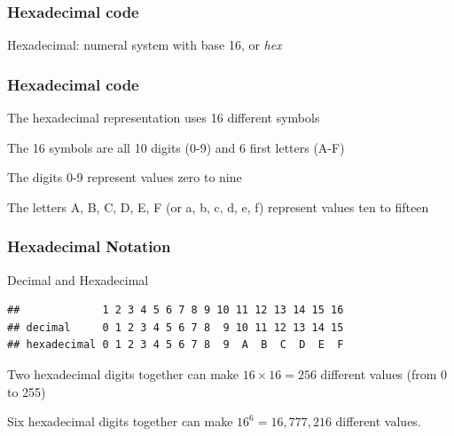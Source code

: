 \documentclass[12pt]{beamer}\usepackage[]{graphicx}\usepackage[]{color}
\makeatletter
\newenvironment{kframe}{%
 \def\at@end@of@kframe{}%
 \ifinner\ifhmode%
  \def\at@end@of@kframe{\end{minipage}}%
  \begin{minipage}{\columnwidth}%
 \fi\fi%
 \def\FrameCommand##1{\hskip\@totalleftmargin \hskip-\fboxsep
 \colorbox{shadecolor}{##1}\hskip-\fboxsep
     \hskip-\linewidth \hskip-\@totalleftmargin \hskip\columnwidth}%
 \MakeFramed {\advance\hsize-\width
   \@totalleftmargin\z@ \linewidth\hsize
   \@setminipage}}%
 {\par\unskip\endMakeFramed%
 \at@end@of@kframe}
\newenvironment{knitrout}{}{} %
\makeatother
\begin{document}

\begin{frame}
\frametitle{Hexadecimal code}

\begin{center}
Hexadecimal: numeral system with base 16, or \textit{hex}

\bigskip
{}
\end{center}

\end{frame}


\begin{frame}
\frametitle{Hexadecimal code}

 \bi
  \item The hexadecimal representation uses 16 different symbols
  \item The 16 symbols are all 10 digits (0-9) and 6 first letters (A-F)
  \item The digits 0-9 represent values zero to nine
  \item The letters A, B, C, D, E, F (or a, b, c, d, e, f) represent values ten to fifteen
 \ei
\eb

\end{frame}


\begin{frame}[fragile]
\frametitle{Hexadecimal Notation}

Decimal and Hexadecimal
\begin{knitrout}\scriptsize
{}\color{fgcolor}\begin{kframe}
\begin{verbatim}
##             1 2 3 4 5 6 7 8 9 10 11 12 13 14 15 16
## decimal     0 1 2 3 4 5 6 7 8  9 10 11 12 13 14 15
## hexadecimal 0 1 2 3 4 5 6 7 8  9  A  B  C  D  E  F
\end{verbatim}
\end{kframe}
\end{knitrout}

{\lit Two hexadecimal digits together can make $16 \times 16 = 256$ different values (from 0 to 255)

\bigskip
Six hexadecimal digits together can make $16^6 = 16,777,216$ different values.}
\end{frame}
\end{document}

